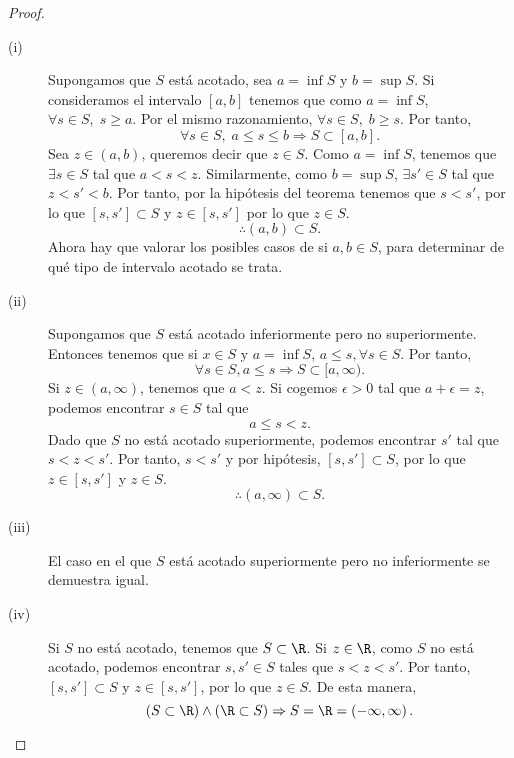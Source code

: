 \begin{proof}
\begin{description}
	\item[(i)] Supongamos que $\displaystyle S $ está acotado, sea $\displaystyle a = \inf S $ y $\displaystyle b = \sup S $. Si consideramos el intervalo $\displaystyle \left[a,b\right]  $ tenemos que como $\displaystyle a = \inf S $, $\displaystyle \forall s \in S, \; s \geq a $. Por el mismo razonamiento, $\displaystyle \forall s \in S, \; b \geq s $. Por tanto, 
	\[\forall s \in S, \; a\leq s \leq b \Rightarrow S \subset \left[a,b\right]  .\]
	Sea $\displaystyle z \in \left(a,b\right) $, queremos decir que $\displaystyle z \in S $. Como $\displaystyle a = \inf S $, tenemos que $\displaystyle \exists s \in S $ tal que $\displaystyle a < s < z $. Similarmente, como $\displaystyle b = \sup S $, $\displaystyle \exists s' \in S $ tal que $\displaystyle z < s' < b $. Por tanto, por la hipótesis del teorema tenemos que $\displaystyle s < s' $, por lo que $\displaystyle \left[s,s'\right] \subset S $ y $\displaystyle z \in [s, s'] $ por lo que $\displaystyle z \in S $. 
	\[\therefore \left(a,b\right) \subset S .\]
Ahora hay que valorar los posibles casos de si $\displaystyle a,b \in S $, para determinar de qué tipo de intervalo acotado se trata.
\item[(ii)] Supongamos que $\displaystyle S $ está acotado inferiormente pero no superiormente. Entonces tenemos que si $\displaystyle x \in S $ y $\displaystyle a = \inf S $, $\displaystyle a \leq s, \forall s \in S $. Por tanto, 
	\[\forall s \in S, a \leq s \Rightarrow S \subset [a, \infty) .\]
Si $\displaystyle z \in \left(a, \infty\right) $, tenemos que $\displaystyle a < z $. Si cogemos $\displaystyle \epsilon > 0 $ tal que $\displaystyle a + \epsilon = z $, podemos encontrar $\displaystyle s \in S $ tal que 
\[a \leq s < z .\]
Dado que $\displaystyle S $ no está acotado superiormente, podemos encontrar $\displaystyle s' $ tal que $\displaystyle s < z < s' $. Por tanto, $\displaystyle s < s' $ y por hipótesis, $\displaystyle \left[s,s'\right] \subset S $, por lo que $\displaystyle z \in \left[s, s'\right]  $ y $\displaystyle z \in S $.
\[\therefore \left(a, \infty\right) \subset S .\]
\item[(iii)] El caso en el que $\displaystyle S $ está acotado superiormente pero no inferiormente se demuestra igual. 
\item[(iv)] Si $\displaystyle S $ no está acotado, tenemos que $\displaystyle S \subset \R $. Si $\displaystyle z \in \R $, como $\displaystyle S $ no está acotado, podemos encontrar $\displaystyle s, s' \in S $ tales que $\displaystyle s < z < s' $. Por tanto, $\displaystyle \left[s,s'\right] \subset S $ y $\displaystyle z \in \left[s,s'\right]  $, por lo que $\displaystyle z \in S $. De esta manera, 
	\[ (S \subset \R) \land (\R \subset S) \Rightarrow S = \R = \left(- \infty, \infty\right) .\]
\end{description}
\end{proof}

